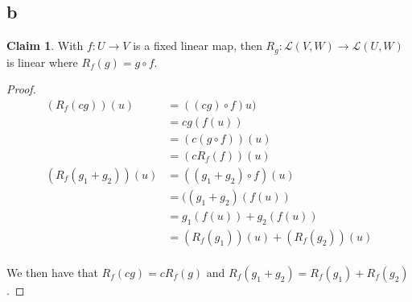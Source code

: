 \documentclass[12pt,letterpaper]{article}
\theoremstyle{definition}
\newtheorem*{claim}{Claim}
\begin{document}
\subsection*{b}

\begin{claim}
  With $f: U \rightarrow V$ is a fixed linear map, then $R_g: \mathcal{L}(V, W)
  \rightarrow \mathcal{L}(U, W)$ is linear where $R_f(g) = g \circ f$.
\end{claim}

\begin{proof}
  \begin{align*}
    (R_f(cg))(u) &= ((cg) \circ f)u) \\
                 &= cg(f(u)) \\
                 &= (c(g \circ f))(u) \\
                 &= (cR_f(f))(u) \\
    (R_f(g_1 + g_2))(u) &= ((g_1 + g_2) \circ f)(u) \\
                 &= ((g_1 + g_2)(f(u)) \\
                 &= g_1(f(u)) + g_2(f(u)) \\
                 &= (R_f(g_1))(u) + (R_f(g_2))(u) \\
  \end{align*}

  We then have that $R_f(cg) = cR_f(g)$ and $R_f(g_1 + g_2) = R_f(g_1) + R_f(g_2)$.
\end{proof}
\end{document}
